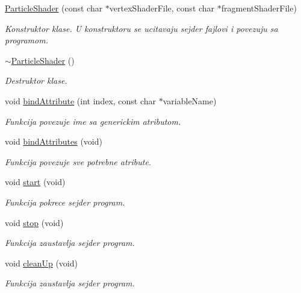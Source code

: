 \begin{DoxyCompactItemize}
\item 
\hyperlink{classshader_1_1ParticleShader_a6d6ce75a7f4712ca8da5213c2c4a97e0}{Particle\+Shader} (const char $\ast$vertex\+Shader\+File, const char $\ast$fragment\+Shader\+File)
\begin{DoxyCompactList}\small\item\em Konstruktor klase. U konstruktoru se ucitavaju sejder fajlovi i povezuju sa programom. \end{DoxyCompactList}\item 
\hyperlink{classshader_1_1ParticleShader_a7ca6c909aba78e143a999439382e80e9}{$\sim$\+Particle\+Shader} ()
\begin{DoxyCompactList}\small\item\em Destruktor klase. \end{DoxyCompactList}\item 
void \hyperlink{classshader_1_1ParticleShader_aa611292ef9c9c034468bd2a9328a9b92}{bind\+Attribute} (int index, const char $\ast$variable\+Name)
\begin{DoxyCompactList}\small\item\em Funkcija povezuje ime sa generickim atributom. \end{DoxyCompactList}\item 
void \hyperlink{classshader_1_1ParticleShader_a61970d8c092a983f998e00352cb27783}{bind\+Attributes} (void)
\begin{DoxyCompactList}\small\item\em Funkcija povezuje sve potrebne atribute. \end{DoxyCompactList}\item 
void \hyperlink{classshader_1_1ParticleShader_ab1259c5e260115413e169eb1264ced12}{start} (void)
\begin{DoxyCompactList}\small\item\em Funkcija pokrece sejder program. \end{DoxyCompactList}\item 
void \hyperlink{classshader_1_1ParticleShader_a2695a213b94d3d9eca0b381dec26b70a}{stop} (void)
\begin{DoxyCompactList}\small\item\em Funkcija zaustavlja sejder program. \end{DoxyCompactList}\item 
void \hyperlink{classshader_1_1ParticleShader_a541dcc9aca73386bc38f7f364af20a16}{clean\+Up} (void)
\begin{DoxyCompactList}\small\item\em Funkcija zaustavlja sejder program. \end{DoxyCompactList}\item 

\end{DoxyCompactItemize}
